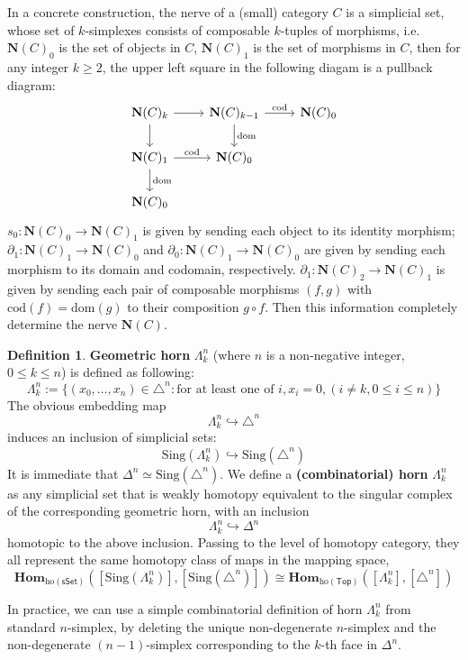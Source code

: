 \documentclass{article}
\theoremstyle{definition}
\newtheorem{mydef}{Definition}[section]
\theoremstyle{remark}
\begin{document}
In a concrete construction, the nerve of a (small) category $C$ is a simplicial set, whose set of $k$-simplexes consists of composable $k$-tuples of morphisms, i.e. $\mathbf{N}(C)_0$ is the set of objects in $C$, $\mathbf{N}(C)_1$ is the set of morphisms in $C$, then for any integer $k \geq 2$, the upper left square in the following diagam is a pullback diagram: $$ \begin{tikzcd} \mathbf{N}(C)_k \arrow[r] \arrow[d] & \mathbf{N}(C)_{k-1} \arrow[d,"\mathrm{dom}"] \arrow[r,"\mathrm{cod}"] & \mathbf{N}(C)_0 \\ \mathbf{N}(C)_1 \arrow[d,"\mathrm{dom}"] \arrow[r,"\mathrm{cod}"] & \mathbf{N}(C)_0 \\ \mathbf{N}(C)_0 \end{tikzcd}$$ $s_0:\mathbf{N}(C)_0 \to \mathbf{N}(C)_1$ is given by sending each object to its identity morphism; $\partial_1: \mathbf{N}(C)_1 \to \mathbf{N}(C)_0 $ and $\partial_0:\mathbf{N}(C)_1 \to \mathbf{N}(C)_0 $ are given by sending each morphism to its domain and codomain, respectively. $\partial_1: \mathbf{N}(C)_2 \to \mathbf{N}(C)_1 $ is given by sending each pair of composable morphisms $(f,g)$ with $\mathrm{cod}(f)=\mathrm{dom}(g)$ to their composition $g \circ f$. Then this information completely determine the nerve $\mathbf{N}(C)$.

\begin{mydef}

\textbf{Geometric horn} $\Lambda^n_k$ (where $n$ is a non-negative integer, $0 \leq k \leq n$) is defined as following: $$ \Lambda^n_k:=\{(x_0,\dots,x_n) \in \triangle^n: \text{for at least one of }i, x_i=0, (i \ne k, 0 \leq i \leq n)\}$$ The obvious embedding map $$ \Lambda^n_k \hookrightarrow \triangle^n $$ induces an inclusion of simplicial sets: $$ \mathrm{Sing}(\Lambda^n_k) \hookrightarrow \mathrm{Sing}(\triangle^n)$$ It is immediate that $\Delta^n \simeq \mathrm{Sing}(\triangle^n)$. We define a \textbf{(combinatorial) horn} $\Lambda^n_k$ as any simplicial set that is weakly homotopy equivalent to the singular complex of the corresponding geometric horn, with an inclusion $$ \Lambda^n_k \hookrightarrow \Delta^n $$ homotopic to the above inclusion. Passing to the level of homotopy category, they all represent the same homotopy class of maps in the mapping space, $$\mathbf{Hom}_{\mathrm{ho}(\mathsf{sSet})}([\mathrm{Sing}(\Lambda^n_k)],[\mathrm{Sing}(\triangle^n)]) \cong \mathbf{Hom}_{\mathrm{ho}(\mathsf{Top})}([\Lambda^n_k],[\triangle^n])$$

In practice, we can use a simple combinatorial definition of horn $\Lambda^n_k$ from standard $n$-simplex, by deleting the unique non-degenerate $n$-simplex and the non-degenerate $(n-1)$-simplex corresponding to the $k$-th face in $\Delta^n$.

\end{mydef}
\end{document}
